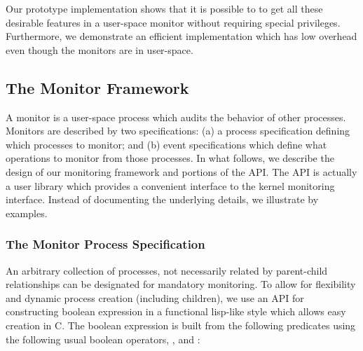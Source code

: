 Our prototype implementation shows that it is possible to to get all
these desirable features in a user-space monitor without requiring special
privileges. Furthermore, we demonstrate an efficient implementation
which has low overhead even though the monitors are in user-space.


\subsection{The Monitor Framework}
\label{sec:lbox-framework}

A monitor is a user-space process which audits the behavior of other processes.
Monitors are described by two specifications:
(a) a process specification defining which processes to monitor; and
(b) event specifications which define what operations to monitor from
those processes.
In what follows, we describe the design of our monitoring framework and
portions of the API. The API is actually a user library which provides
a convenient interface to the kernel monitoring interface.
Instead of documenting the underlying details, we illustrate by examples.

\subsubsection{The Monitor Process Specification}

An arbitrary collection of processes, not necessarily related by parent-child
relationships can be designated for mandatory monitoring.
To allow for flexibility and dynamic process creation (including children),
we use an API for constructing boolean expression in a functional lisp-like
style which allows easy creation in C.
The boolean expression is built from the following predicates using
the following usual boolean operators, ,  and :


